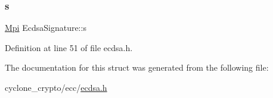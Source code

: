 \subsubsection{\texorpdfstring{s}{s}}
{\footnotesize\ttfamily \hyperlink{structMpi}{Mpi} Ecdsa\+Signature\+::s}



Definition at line 51 of file ecdsa.\+h.



The documentation for this struct was generated from the following file\+:\begin{DoxyCompactItemize}
\item 
cyclone\+\_\+crypto/ecc/\hyperlink{ecdsa_8h}{ecdsa.\+h}\end{DoxyCompactItemize}
